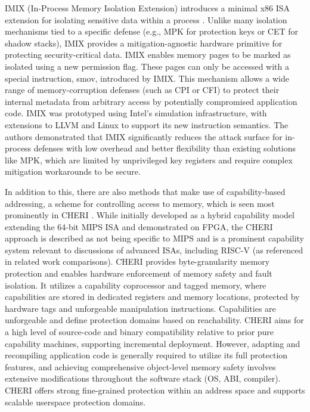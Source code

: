 \documentclass[conference,compsoc]{IEEEtran}
\begin{document}
IMIX (In-Process Memory Isolation Extension) introduces a minimal x86 ISA extension for isolating sensitive data within a process \cite{IMIX}. Unlike many isolation mechanisms tied to a specific defense (e.g., MPK for protection keys or CET for shadow stacks), IMIX provides a mitigation-agnostic hardware primitive for protecting security-critical data. IMIX enables memory pages to be marked as isolated using a new permission flag. These pages can only be accessed with a special instruction, smov, introduced by IMIX. This mechanism allows a wide range of memory-corruption defenses (such as CPI or CFI) to protect their internal metadata from arbitrary access by potentially compromised application code. IMIX was prototyped using Intel’s simulation infrastructure, with extensions to LLVM and Linux to support its new instruction semantics. The authors demonstrated that IMIX significantly reduces the attack surface for in-process defenses with low overhead and better flexibility than existing solutions like MPK, which are limited by unprivileged key registers and require complex mitigation workarounds to be secure.

In addition to this, there are also methods that make use of capability-based addressing, a scheme for controlling access to memory, which is seen most prominently in CHERI \cite{CHERI}. While initially developed as a hybrid capability model extending the 64-bit MIPS ISA and demonstrated on FPGA, the CHERI approach is described as not being specific to MIPS and is a prominent capability system relevant to discussions of advanced ISAs, including RISC-V (as referenced in related work comparisons). CHERI provides byte-granularity memory protection and enables hardware enforcement of memory safety and fault isolation. It utilizes a capability coprocessor and tagged memory, where capabilities are stored in dedicated registers and memory locations, protected by hardware tags and unforgeable manipulation instructions. Capabilities are unforgeable and define protection domains based on reachability. CHERI aims for a high level of source-code and binary compatibility relative to prior pure capability machines, supporting incremental deployment. However, adapting and recompiling application code is generally required to utilize its full protection features, and achieving comprehensive object-level memory safety involves extensive modifications throughout the software stack (OS, ABI, compiler). CHERI offers strong fine-grained protection within an address space and supports scalable userspace protection domains.
\end{document}
